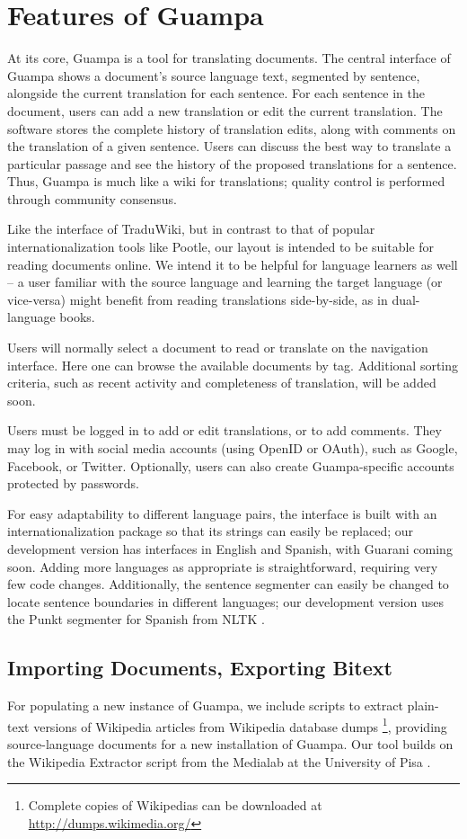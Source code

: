\documentclass[10pt, a4paper]{article}
\begin{document}
\section{Features of Guampa}
At its core, Guampa is a tool for translating documents. The central interface of
Guampa shows a document's source language text, segmented by sentence,
alongside the current translation for each sentence. For each sentence in the
document, users can add a new translation or edit the current translation. The
software stores the complete history of translation edits, along with comments
on the translation of a given sentence. Users can discuss the
best way to translate a particular passage and see the history of the proposed
translations for a sentence. Thus, Guampa is much like a wiki for translations;
quality control is performed through community consensus.


Like the interface of TraduWiki, but in contrast to that of popular
internationalization tools like Pootle, our layout is intended to be suitable
for reading documents online. We intend it to be helpful for language learners
as well -- a user familiar with the source language and learning the target
language (or vice-versa) might benefit from reading translations side-by-side,
as in dual-language books.

Users will normally select a document to read or translate on the navigation
interface. Here one can browse the available documents by tag. Additional
sorting criteria, such as recent activity and completeness of translation, will
be added soon.

Users must be logged in to add or edit translations, or to add comments. They
may log in with social media accounts (using OpenID or OAuth), such as Google,
Facebook, or Twitter. Optionally, users can also create Guampa-specific
accounts protected by passwords.

For easy adaptability to different language pairs, the interface is built with
an internationalization package so that its strings can easily be replaced; our
development version has interfaces in English and Spanish, with Guarani coming
soon. Adding more languages as appropriate is straightforward, requiring very
few code changes. Additionally, the sentence segmenter can easily be changed
to locate sentence boundaries in different languages; our development
version uses the Punkt segmenter for Spanish from NLTK \cite{nltkbook}.


\subsection{Importing Documents, Exporting Bitext}
For populating a new instance of Guampa, we include scripts to extract
plain-text versions of Wikipedia articles from Wikipedia database dumps
\footnote{Complete copies of Wikipedias can be downloaded at \\
\url{http://dumps.wikimedia.org/}}, providing source-language documents for a
new installation of Guampa. Our tool builds on the Wikipedia Extractor
script from the Medialab at the University of Pisa \cite{pisa-wp-extractor}.
\end{document}

